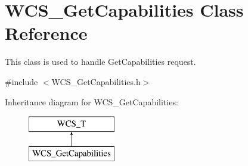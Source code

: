 \hypertarget{classWCS__GetCapabilities}{
\section{WCS\_\-GetCapabilities Class Reference}
\label{classWCS__GetCapabilities}
}


This class is used to handle GetCapabilities request.  




{\ttfamily \#include $<$WCS\_\-GetCapabilities.h$>$}

Inheritance diagram for WCS\_\-GetCapabilities:\begin{figure}[H]
\begin{center}
\leavevmode
\includegraphics[height=2.000000cm]{classWCS__GetCapabilities}
\end{center}
\end{figure}
